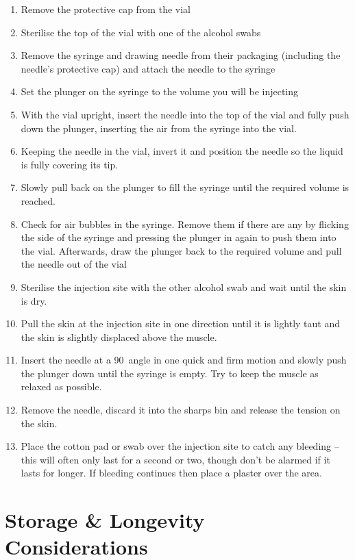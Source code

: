 \documentclass[twoside,a5paper]{article}
\begin{document}
\begin{enumerate}
\item Remove the protective cap from the vial
\item Sterilise the top of the vial with one of the alcohol swabs
\item Remove the syringe and drawing needle from their packaging
  (including the needle's protective cap) and attach the needle to the
  syringe
\item Set the plunger on the syringe to the volume you will be injecting
\item With the vial upright, insert the needle into the top of the
  vial and fully push down the plunger, inserting the air from the
  syringe into the vial.
\item Keeping the needle in the vial, invert it and position the
  needle so the liquid is fully covering its tip.
\item Slowly pull back on the plunger to fill the syringe until the
  required volume is reached.
\item Check for air bubbles in the syringe. Remove them if there are
  any by flicking the side of the syringe and pressing the plunger in
  again to push them into the vial.  Afterwards, draw the plunger back
  to the required volume and pull the needle out of the vial
\item Sterilise the injection site with the other alcohol swab and
  wait until the skin is dry.
\item Pull the skin at the injection site in one direction until it is
  lightly taut and the skin is slightly displaced above the muscle.
\item Insert the needle at a 90\textdegree\ angle in one quick and
  firm motion and slowly push the plunger down until the syringe is
  empty.  Try to keep the muscle as relaxed as possible.
\item Remove the needle, discard it into the sharps bin and release
  the tension on the skin.
\item Place the cotton pad or swab over the injection site to catch
  any bleeding -- this will often only last for a second or two,
  though don't be alarmed if it lasts for longer.  If bleeding
  continues then place a plaster over the area.
\end{enumerate}

\section{Storage \& Longevity Considerations}
\end{document}
